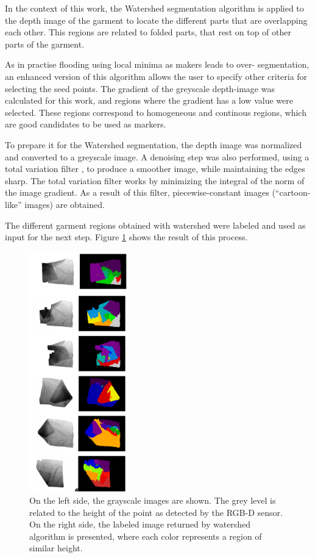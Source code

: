 In the context of this work, the Watershed segmentation algorithm is applied to the depth image of the garment to locate the different parts that are overlapping each other. This regions are related to folded parts, that rest on top of other parts of the garment. 

As in practise flooding using local minima as makers leads to over- segmentation, an enhanced version of this algorithm allows the user to specify other criteria for selecting the seed points. The gradient of the greyscale depth-image was calculated for this work, and regions where the gradient has a low value were selected. These regions correspond to homogeneous and continous regions, which are good candidates to be used as markers.

To prepare it for the Watershed segmentation, the depth image was normalized and converted to a greyscale image. A denoising step was also performed, using a total variation filter , to produce a smoother image, while maintaining the edges sharp. The total variation filter works by minimizing the integral of the norm of the image gradient. As a result of this filter, piecewise-constant images (``cartoon-like'' images) are obtained.

The different garment regions obtained with watershed were labeled and used as input for the next step. Figure \ref{fig:watershed_labels} shows the result of this process.

\begin{figure}[thpb]
    \centering
    \includegraphics[width=0.38\textwidth]{figures/colour_garment.pdf}
    \caption{On the left side, the grayscale images are shown. The grey level is related to the height of the point as detected by the RGB-D sensor. On the right side, the labeled image returned by watershed algorithm is presented, where each color represents a region of similar height.}
    \label{fig:watershed_labels}
\end{figure}